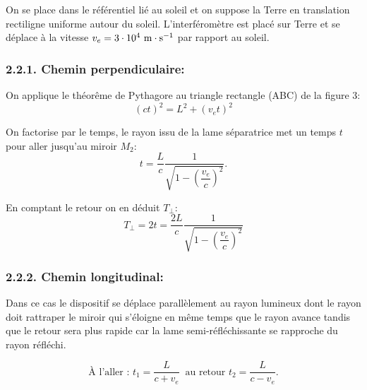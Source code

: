 \documentclass[french, a4paper, 10pt, twocolumn, landscape]{article}
\begin{document}
On se place dans le référentiel lié au soleil et on suppose la Terre en translation rectiligne uniforme autour du soleil. L'interféromètre est placé sur Terre et se déplace à la vitesse $v_e = 3\cdot 10^4 ~\rm m\cdot s^{-1}$ par rapport au soleil. 

\subsubsection*{2.2.1. Chemin perpendiculaire:}


On applique le théorême de Pythagore au triangle rectangle (ABC) de la figure 3:
\begin{equation}
	(ct)^2=L^2+(v_et)^2 \nonumber
\end{equation}

On factorise par le temps, le rayon issu de la lame séparatrice met un temps $t$ pour aller jusqu'au miroir $M_2$: 
\begin{equation}
	t=\dfrac{L}{c}\dfrac{1}{\sqrt{1-\left(\dfrac{v_e}{c}\right)^2}}. \nonumber
\end{equation}

En comptant le retour on en déduit $T_\perp$:
\begin{equation}
	T_\perp=2t=\dfrac{2L}{c}\dfrac{1}{\sqrt{1-\left(\dfrac{v_e}{c}\right)^2}}
\end{equation}

\subsubsection*{2.2.2. Chemin longitudinal:}

Dans ce cas le dispositif se déplace parallèlement au rayon lumineux dont le rayon doit rattraper le miroir qui s'éloigne en même temps que le rayon avance tandis que le retour sera plus rapide car la lame semi-réfléchissante se rapproche du rayon réfléchi.

\begin{equation}
	\text{À l'aller : } t_{1} = \dfrac{L}{c+v_e}~\text{ au retour } t_2=\dfrac{L}{c-v_e}.\nonumber
\end{equation}
\end{document}
